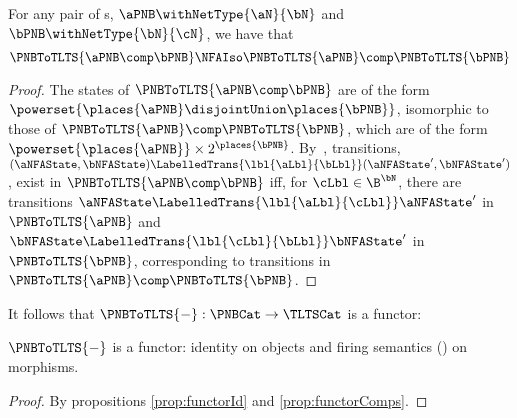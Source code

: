 \begin{proposition}\label{prop:functorComps}
    For any pair of \PNB{}s, $\aPNB \withNetType{\aN}{\bN}$ and $\bPNB
    \withNetType{\bN}{\cN}$, we have that
    \[
    \PNBToTLTS{\aPNB \comp \bPNB}
    \NFAIso
    \PNBToTLTS{\aPNB} \comp \PNBToTLTS{\bPNB}
    \]
\end{proposition}
\begin{proof}
    The states of $\PNBToTLTS{\aPNB \comp \bPNB}$ are of
    the form $\powerset{\places{\aPNB} \disjointUnion \places{\bPNB}}$, isomorphic
    to those of $\PNBToTLTS{\aPNB} \comp \PNBToTLTS{\bPNB}$, which are
    of the form $\powerset{\places{\aPNB}} \times 2^{\places{\bPNB}}$.
    By~\cite[Theorem 3.8]{Bruni2013}, transitions,
    \(
    (\aNFAState, \bNFAState)
    \LabelledTrans{\lbl{\aLbl}{\bLbl}}
    (\aNFAState', \bNFAState')
    \), exist in
    $\PNBToTLTS{\aPNB \comp \bPNB}$ iff, for $\cLbl \in \B^\bN$, there
    are transitions $\aNFAState \LabelledTrans{\lbl{\aLbl}{\cLbl}}
    \aNFAState'$ in $\PNBToTLTS{\aPNB}$ and $\bNFAState
    \LabelledTrans{\lbl{\cLbl}{\bLbl}} \bNFAState'$ in
    $\PNBToTLTS{\bPNB}$, corresponding to transitions in $\PNBToTLTS{\aPNB}
    \comp \PNBToTLTS{\bPNB}$.
\end{proof}

It follows that $\PNBToTLTS{-} : \text{\PNBCat} \to \text{\TLTSCat}$ is a functor:

\begin{proposition}
    $\PNBToTLTS{-}$ is a functor: identity on objects and firing semantics
    () on morphisms.
\end{proposition}
\begin{proof}
    By propositions \ref{prop:functorId} and \ref{prop:functorComps}.
\end{proof}

